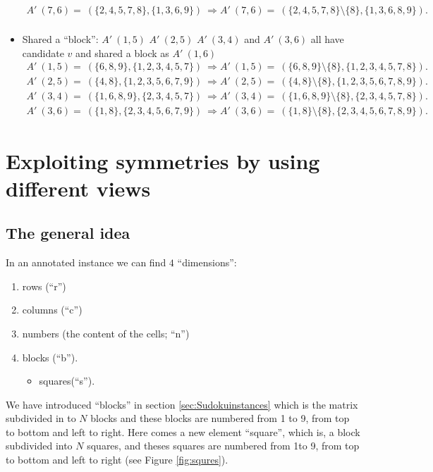 \documentclass[11pt]{report}
\newcommand{\set}[1]{\{ #1 \}}
\begin{document}
\begin{itemize}
\begin{eqnarray*}
A'\ (7,6) =\ (\set{2, 4, 5, 7, 8}, \set{1, 3, 6, 9})\ \Rightarrow A'\ (7,6) =\ (\set{2, 4, 5, 7, 8}\setminus \set{8}, \set{1, 3, 6, 8, 9}).\\
\end{eqnarray*}
\item Shared a ``block'': $A'\ (1,5)$ $A'\ (2,5)$ $A'\ (3,4)$ and $A'\ (3,6)$ all have candidate $v$ and shared a block as $A'\ (1,6)$
\begin{eqnarray*}
A'\ (1,5) =\ (\set{6 ,8, 9}, \set{1, 2, 3, 4, 5, 7})\ \Rightarrow A'\ (1,5) =\ (\set{6 ,8, 9}\setminus \set{8}, \set{1, 2, 3, 4, 5, 7, 8}).\\
A'\ (2,5) =\ (\set{4, 8}, \set{1, 2, 3, 5, 6, 7, 9})\ \Rightarrow A'\ (2,5) =\ (\set{4, 8}\setminus \set{8}, \set{1, 2, 3, 5, 6, 7, 8, 9}).\\
A'\ (3,4) =\ (\set{1, 6, 8, 9}, \set{2, 3, 4, 5, 7})\ \Rightarrow A'\ (3,4) =\ (\set{1, 6, 8, 9}\setminus \set{8}, \set{2, 3, 4, 5, 7, 8}).\\
A'\ (3,6) =\ (\set{1, 8}, \set{2, 3, 4, 5, 6, 7, 9})\ \Rightarrow A'\ (3,6) =\ (\set{1, 8}\setminus \set{8}, \set{2, 3, 4, 5, 6, 7, 8, 9}).
\end{eqnarray*}
\end{itemize}


\chapter{Exploiting symmetries by using different views}
\label{cha:exploitingsymm}


\section{The general idea}
\label{sec:diffviewsidea}

In an annotated instance we can find $4$ ``dimensions'':
\begin{enumerate}
\item rows (``r'')
\item columns (``c'')
\item numbers (the content of the cells; ``n'')
\item blocks (``b'').
\begin{itemize}
\item squares(``s'').
\end{itemize}
\end{enumerate}
We have introduced ``blocks'' in section \ref{sec:Sudokuinstances} which is the matrix subdivided in to $N$ blocks and these blocks are numbered from 1 to 9, from top to bottom and left to right. Here comes a new element ``square'', which is, a block subdivided into $N$ squares, and theses squares are numbered from 1to 9, from top to bottom and left to right (see Figure \ref{fig:squres}). 
\end{document}
